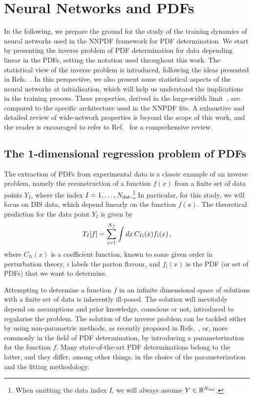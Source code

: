 \section{Neural Networks and PDFs}
\label{sec:Init}


In the following, we prepare the ground for the study of the training dynamics
of neural networks used in the NNPDF framework for PDF determination. We start
by presenting the inverse problem of PDF determination for data depending linear
in the PDFs, setting the notation used throughout this work. The statistical
view of the inverse problem is introduced, following the ideas presented in
Refs.~\cite{DelDebbio:2021whr,Candido:2024hjt}. In this perspective, we also
present some statistical aspects of the neural networks at initialisation, which
will help us understand the implications in the training process. These
properties, derived in the large-width limit~\cite{lee2019wide,jacot2018neural},
are compared to the specific architecture used in the NNPDF fits. A exhaustive
and detailed review of wide-network properties is beyond the scope of this work,
and the reader is encouraged to refer to Ref.~\cite{Roberts:2021fes} for a
comprehensive review.

\subsection{The 1-dimensional regression problem of PDFs}
\label{subsec:inverse_problem}

The extraction of PDFs from experimental data is a classic example of an inverse
problem, namely the reconstruction of a function $f(x)$ from a finite set of
data points $Y_I$, where the index $I=1, \ldots, N_{\mathrm{dat}}$.\footnote{When omitting
the data index $I$, we will always assume $Y \in \mathbb{R}^{N_{\mathrm{dat}}}$.} In
particular, for this study, we will focus on DIS data, which depend linearly on
the function $f(x)$. The theoretical prediction for the data point $Y_I$ is
given by
\begin{equation}
    \label{eq:TheoryPred}
    T_I[f] = \sum_{i=1}^{N_{f}} \int dx\, C_{Ii}(x) f_{i}(x)\, ,
\end{equation}
where $C_{Ii}(x)$ is a coefficient function, known to some given order in
perturbation theory, $i$ labels the parton flavour, and $f_i(x)$ is the PDF (or
set of PDFs) that we want to determine.

Attempting to determine a function $f$ in an infinite dimensional space of
solutions with a finite set of data is inherently ill-posed. The solution will
inevitably depend on assumptions and prior knowledge, conscious or not,
introduced to regularise the problem. The solution of the inverse problem
can be tackled either by using non-parametric methods, as recently proposed
in Refs.~\cite{DelDebbio:2021whr,Candido:2024hjt}, or, more commonly in the
field of PDF determination, by introducing a parameterization for the function
$f$. Many state-of-the-art PDF determinations belong to the latter, and
they differ, among other things, in the choice of the parameterization and the
fitting methodology.

